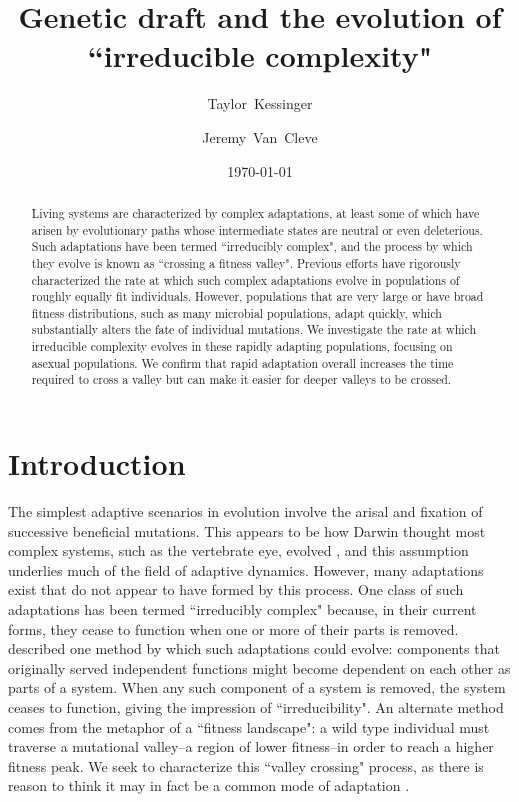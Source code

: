 \documentclass[rmp]{revtex4}
\begin{document}
\title{Genetic draft and the evolution of ``irreducible complexity"}
\author{Taylor~Kessinger}
\author{Jeremy~Van~Cleve}


\date{\today}

\begin{abstract}

Living systems are characterized by complex adaptations, at least some of which have arisen by evolutionary paths whose intermediate states are neutral or even deleterious.
Such adaptations have been termed ``irreducibly complex", and the process by which they evolve is known as ``crossing a fitness valley".
Previous efforts have rigorously characterized the rate at which such complex adaptations evolve in populations of roughly equally fit individuals.
However, populations that are very large or have broad fitness distributions, such as many microbial populations, adapt quickly, which substantially alters the fate of individual mutations.
We investigate the rate at which irreducible complexity evolves in these rapidly adapting populations, focusing on asexual populations.
We confirm that rapid adaptation overall increases the time required to cross a valley but can make it easier for deeper valleys to be crossed.
\end{abstract}

\maketitle

\section*{Introduction}

The simplest adaptive scenarios in evolution involve the arisal and fixation of successive beneficial mutations.
This appears to be how Darwin thought most complex systems, such as the vertebrate eye, evolved \citep{darwin_1859}, and this assumption underlies much of the field of adaptive dynamics.
However, many adaptations exist that do not appear to have formed by this process.
One class of such adaptations has been termed ``irreducibly complex" because, in their current forms, they cease to function when one or more of their parts is removed.
\citet{muller_1918} described one method by which such adaptations could evolve: components that originally served independent functions might become dependent on each other as parts of a system.
When any such component of a system is removed, the system ceases to function, giving the impression of ``irreducibility".
An alternate method comes from the metaphor of a ``fitness landscape": a wild type individual must traverse a mutational valley--a region of lower fitness--in order to reach a higher fitness peak.
We seek to characterize this ``valley crossing" process, as there is reason to think it may in fact be a common mode of adaptation \citep{trotter_2014}.
\end{document}
